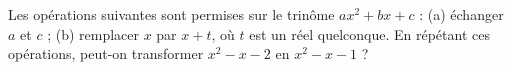Les opérations suivantes sont permises sur le trinôme $ax^2 + bx + c$ : (a) échanger $a$ et $c$ ; (b) remplacer $x$ par $x + t$, où $t$ est un réel quelconque. En répétant ces opérations, peut-on transformer $x^2 - x - 2$ en $x^2 - x - 1$ ?
